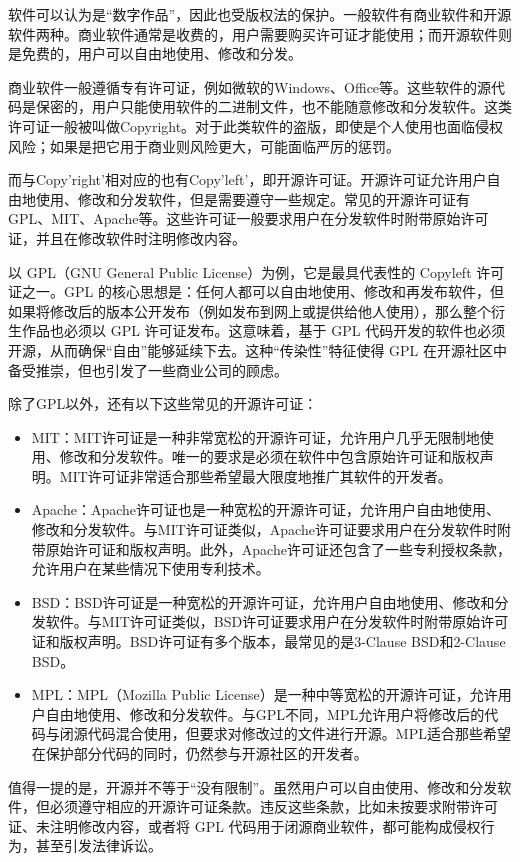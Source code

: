 软件可以认为是“数字作品”，因此也受版权法的保护。一般软件有商业软件和开源软件两种。商业软件通常是收费的，用户需要购买许可证才能使用；而开源软件则是免费的，用户可以自由地使用、修改和分发。

商业软件一般遵循专有许可证，例如微软的Windows、Office等。这些软件的源代码是保密的，用户只能使用软件的二进制文件，也不能随意修改和分发软件。这类许可证一般被叫做Copyright。对于此类软件的盗版，即使是个人使用也面临侵权风险；如果是把它用于商业则风险更大，可能面临严厉的惩罚。

而与Copy'right'相对应的也有Copy'left'，即开源许可证。开源许可证允许用户自由地使用、修改和分发软件，但是需要遵守一些规定。常见的开源许可证有GPL、MIT、Apache等。这些许可证一般要求用户在分发软件时附带原始许可证，并且在修改软件时注明修改内容。

以 GPL（GNU General Public License）为例，它是最具代表性的 Copyleft 许可证之一。GPL 的核心思想是：任何人都可以自由地使用、修改和再发布软件，但如果将修改后的版本公开发布（例如发布到网上或提供给他人使用），那么整个衍生作品也必须以 GPL 许可证发布。这意味着，基于 GPL 代码开发的软件也必须开源，从而确保“自由”能够延续下去。这种“传染性”特征使得 GPL 在开源社区中备受推崇，但也引发了一些商业公司的顾虑。

除了GPL以外，还有以下这些常见的开源许可证：
\begin{itemize}
  \item MIT：MIT许可证是一种非常宽松的开源许可证，允许用户几乎无限制地使用、修改和分发软件。唯一的要求是必须在软件中包含原始许可证和版权声明。MIT许可证非常适合那些希望最大限度地推广其软件的开发者。
  \item Apache：Apache许可证也是一种宽松的开源许可证，允许用户自由地使用、修改和分发软件。与MIT许可证类似，Apache许可证要求用户在分发软件时附带原始许可证和版权声明。此外，Apache许可证还包含了一些专利授权条款，允许用户在某些情况下使用专利技术。
  \item BSD：BSD许可证是一种宽松的开源许可证，允许用户自由地使用、修改和分发软件。与MIT许可证类似，BSD许可证要求用户在分发软件时附带原始许可证和版权声明。BSD许可证有多个版本，最常见的是3-Clause BSD和2-Clause BSD。
  \item MPL：MPL（Mozilla Public License）是一种中等宽松的开源许可证，允许用户自由地使用、修改和分发软件。与GPL不同，MPL允许用户将修改后的代码与闭源代码混合使用，但要求对修改过的文件进行开源。MPL适合那些希望在保护部分代码的同时，仍然参与开源社区的开发者。
\end{itemize}

值得一提的是，开源并不等于“没有限制”。虽然用户可以自由使用、修改和分发软件，但必须遵守相应的开源许可证条款。违反这些条款，比如未按要求附带许可证、未注明修改内容，或者将 GPL 代码用于闭源商业软件，都可能构成侵权行为，甚至引发法律诉讼。



